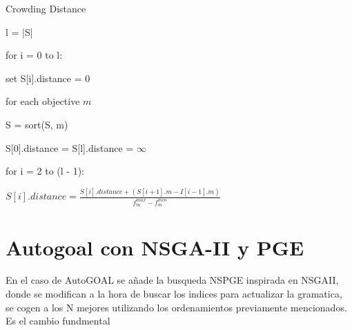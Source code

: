 \begin{algorithm*}\caption{Crowding Distance}
    l = |S|

    for i = 0 to l:

    \quad set S[i].distance = 0

    for each objective $m$

    \quad S = sort(S, m)

    \quad S[0].distance = S[l].distance = $\infty$

    \quad for i = 2 to (l - 1):

    \qquad 
    \begin{math}
        S[i].distance  = \frac{S[i].distance + (S[i + 1].m - I[i - 1].m)}{f^{max}_{m} - f^{min}_m}
    \end{math}
\end{algorithm*}


\section{Autogoal con NSGA-II y PGE}

En el caso de AutoGOAL se añade la busqueda NSPGE inspirada en NSGAII, donde se modifican a la hora de buscar los indices para actualizar la gramatica, se cogen a los N mejores utilizando los ordenamientos previamente mencionados. Es el cambio fundmental


